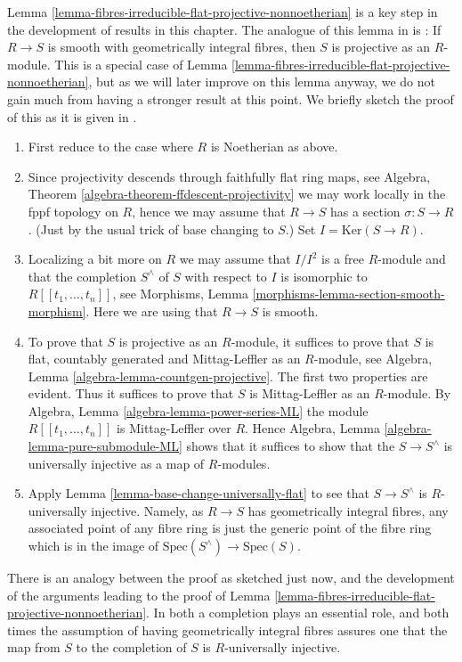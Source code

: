 \begin{remark}
\label{remark-how-in-RG}
Lemma \ref{lemma-fibres-irreducible-flat-projective-nonnoetherian}
is a key step in the development of results in this chapter. The analogue
of this lemma in \cite{GruRay} is \cite[I Proposition 3.3.1]{GruRay}:
If $R \to S$ is smooth with geometrically integral fibres, then $S$
is projective as an $R$-module. This is a special case of
Lemma \ref{lemma-fibres-irreducible-flat-projective-nonnoetherian},
but as we will later improve on this lemma anyway, we do not gain much
from having a stronger result at this point.
We briefly sketch the proof of this as it is given in \cite{GruRay}.
\begin{enumerate}
\item First reduce to the case where $R$ is Noetherian as above.
\item Since projectivity descends through faithfully flat ring maps, see
Algebra, Theorem \ref{algebra-theorem-ffdescent-projectivity}
we may work locally in the fppf topology on $R$, hence we may assume
that $R \to S$ has a section $\sigma : S \to R$. (Just by the usual trick of
base changing to $S$.) Set $I = \text{Ker}(S \to R)$.
\item Localizing a bit more on $R$ we may assume that $I/I^2$ is a free
$R$-module and that the completion $S^\wedge$ of $S$ with respect to $I$
is isomorphic to $R[[t_1, \ldots, t_n]]$, see
Morphisms, Lemma \ref{morphisms-lemma-section-smooth-morphism}.
Here we are using that $R \to S$ is smooth.
\item To prove that $S$ is projective as an $R$-module, it suffices to
prove that $S$ is flat, countably generated and Mittag-Leffler as an
$R$-module, see
Algebra, Lemma \ref{algebra-lemma-countgen-projective}.
The first two properties are evident. Thus it suffices to prove that $S$
is Mittag-Leffler as an $R$-module. By
Algebra, Lemma \ref{algebra-lemma-power-series-ML}
the module $R[[t_1, \ldots, t_n]]$ is Mittag-Leffler over $R$. Hence
Algebra, Lemma \ref{algebra-lemma-pure-submodule-ML}
shows that it suffices to show that the
$S \to S^\wedge$ is universally injective as a map of $R$-modules.
\item Apply
Lemma \ref{lemma-base-change-universally-flat}
to see that $S \to S^\wedge$ is $R$-universally injective.
Namely, as $R \to S$ has geometrically integral fibres, any associated
point of any fibre ring is just the generic point of the fibre ring which
is in the image of $\text{Spec}(S^\wedge) \to \text{Spec}(S)$.
\end{enumerate}
There is an analogy between the proof as sketched just now, and the
development of the arguments leading to the proof of
Lemma \ref{lemma-fibres-irreducible-flat-projective-nonnoetherian}.
In both a completion plays an essential role, and both times the
assumption of having geometrically integral fibres assures one that the
map from $S$ to the completion of $S$ is $R$-universally injective.
\end{remark}













